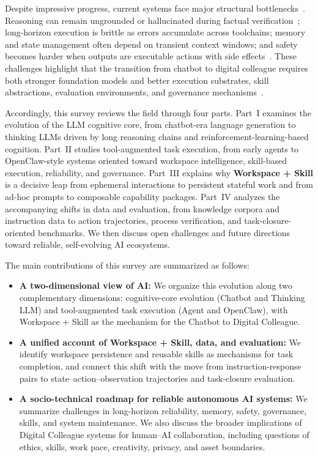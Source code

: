 Despite impressive progress, current systems face major structural bottlenecks~\citep{liu2023agentbench,zhou2023webarena,jimenez2023swebench,xie2024osworld}. Reasoning can remain ungrounded or hallucinated during factual verification~\citep{huang2023hallucination,ji2023hallucination}; long-horizon execution is brittle as errors accumulate across toolchains\citep{liu2023agentbench,zhou2023webarena,jimenez2023swebench}; memory and state management often depend on transient context windows\citep{packer2023memgpt,zhang2025survey}; and safety becomes harder when outputs are executable actions with side effects~\citep{ruan2024identifying,debenedetti2024agentdojo,zhan2024injecagent}. These challenges highlight that the transition from chatbot to digital colleague requires both stronger foundation models and better execution substrates, skill abstractions, evaluation environments, and governance mechanisms~\citep{wang2024openhands,yang2024sweagent,wang2023voyager,drouin2024workarena,li2026prism,zhao2026clawguard}.

Accordingly, this survey reviews the field through four parts. Part~I examines the evolution of the LLM cognitive core, from chatbot-era language generation to thinking LLMs driven by long reasoning chains and reinforcement-learning-based cognition. Part~II studies tool-augmented task execution, from early agents to OpenClaw-style systems oriented toward workspace intelligence, skill-based execution, reliability, and governance. Part~III explains why \textbf{Workspace + Skill} is a decisive leap from ephemeral interactions to persistent stateful work and from ad-hoc prompts to composable capability packages. Part~IV analyzes the accompanying shifts in data and evaluation, from knowledge corpora and instruction data to action trajectories, process verification, and task-closure-oriented benchmarks. We then discuss open challenges and future directions toward reliable, self-evolving AI ecosystems.

The main contributions of this survey are summarized as follows:
\begin{itemize}[leftmargin=*, itemsep=2pt, topsep=3pt]
    \item \textbf{A two-dimensional view of AI:} We organize this evolution along two complementary dimensions: cognitive-core evolution (Chatbot and Thinking LLM) and tool-augmented task execution (Agent and OpenClaw), with Workspace + Skill as the mechanism for the Chatbot to Digital Colleague.
    \item \textbf{A unified account of Workspace + Skill, data, and evaluation:} We identify workspace persistence and reusable skills as mechanisms for task completion, and connect this shift with the move from instruction-response pairs to state--action--observation trajectories and task-closure evaluation.
    \item \textbf{A socio-technical roadmap for reliable autonomous AI systems:} We summarize challenges in long-horizon reliability, memory, safety, governance, skills, and system maintenance. We also discuss the broader implications of Digital Colleague systems for human–AI collaboration, including questions of ethics, skills, work pace, creativity, privacy, and asset boundaries.
\end{itemize}

